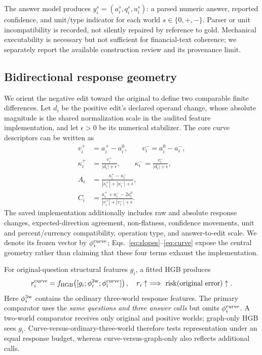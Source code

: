 \documentclass[11pt]{article}
\newcommand{\risk}{\operatorname{risk}}
\begin{document}
The answer model produces $y_i^s=(a_i^s,q_i^s,u_i^s)$: a parsed numeric answer, reported confidence, and unit/type indicator for each world $s\in\{0,+,-\}$. Parser or unit incompatibility is recorded, not silently repaired by reference to gold. Mechanical executability is necessary but not sufficient for financial-text coherence; we separately report the available construction review and its provenance limit.

\subsection{Bidirectional response geometry}
We orient the negative edit toward the original to define two comparable finite differences. Let $d_i$ be the positive edit's declared operand change, whose absolute magnitude is the shared normalization scale in the audited feature implementation, and let $\epsilon>0$ be its numerical stabilizer. The core curve descriptors can be written as
\begin{align}
v_i^+ &= a_i^+-a_i^0,\qquad v_i^- = a_i^0-a_i^-,\nonumber\\
\kappa_i^+ &= \frac{v_i^+}{|d_i|+\epsilon},\qquad
\kappa_i^- = \frac{v_i^-}{|d_i|+\epsilon},\label{eq:slopes}\\
A_i &=\frac{\kappa_i^+-\kappa_i^-}{|\kappa_i^+|+|\kappa_i^-|+\epsilon},\\
C_i &=\frac{a_i^++a_i^- -2a_i^0}{|v_i^+|+|v_i^-|+\epsilon}.
\label{eq:curve}
\end{align}
The saved implementation additionally includes raw and absolute response changes, expected-direction agreement, non-flatness, confidence movements, unit and percent/currency compatibility, operation type, and answer-to-edit scale. We denote its frozen vector by $\phi_i^{\rm curve}$; Eqs.~\ref{eq:slopes}--\ref{eq:curve} expose the central geometry rather than claiming that these four terms exhaust the implementation.

For original-question structural features $g_i$, a fitted HGB produces
\begin{equation}
r_i^{\rm curve}=f_{\rm HGB}\!\left([g_i;\phi_i^{\rm 3w};\phi_i^{\rm curve}]\right),
\quad r_i\uparrow\ \Longrightarrow\ \risk(\text{original error})\uparrow.
\label{eq:risk}
\end{equation}
Here $\phi_i^{\rm 3w}$ contains the ordinary three-world response features. The primary comparator uses the \emph{same questions and three answer calls} but omits $\phi_i^{\rm curve}$. A two-world comparator receives only original and positive worlds; graph-only HGB sees $g_i$. Curve-versus-ordinary-three-world therefore tests representation under an equal response budget, whereas curve-versus-graph-only also reflects additional calls.
\end{document}
